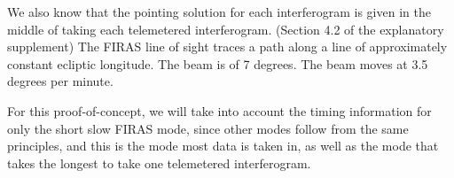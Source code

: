 \documentclass{article}
\begin{document}
We also know that the pointing solution for each interferogram is given in the middle of taking each telemetered interferogram. (Section 4.2 of the explanatory supplement) The FIRAS line of sight traces a path along a line of approximately constant ecliptic longitude. The beam is of 7 degrees. The beam moves at 3.5 degrees per minute. 

For this proof-of-concept, we will take into account the timing information for only the short slow FIRAS mode, since other modes follow from the same principles, and this is the mode most data is taken in, as well as the mode that takes the longest to take one telemetered interferogram.
%



\end{document}

